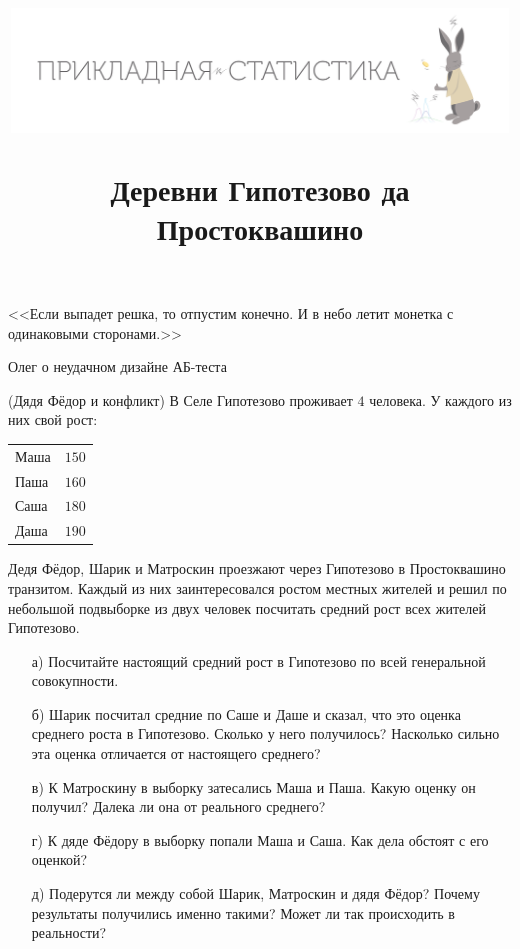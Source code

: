 \documentclass[12pt, a4paper, oneside]{article}
\title{\begin{center} \includegraphics[width=0.99\textwidth]{logo.png} \end{center}Деревни Гипотезово да Простоквашино}
\date{ } %
\begin{document}

\maketitle

\epigraph{<<Если выпадет решка, то отпустим конечно.  И в небо летит монетка с одинаковыми сторонами.>>}{Олег о неудачном дизайне АБ-теста}

\begin{problem}{(Дядя Фёдор и конфликт)}
В Селе  Гипотезово проживает $4$ человека. У каждого из них свой рост:

\begin{center}
	\begin{tabular}{lc}
		\toprule
		Маша &  $150$\\
		Паша &  $160$\\
		Саша &  $180$\\
		Даша &  $190$\\ 
		\bottomrule
	\end{tabular}	
\end{center}

Дедя Фёдор, Шарик и Матроскин проезжают через Гипотезово в Простоквашино транзитом. Каждый из них заинтересовался ростом местных жителей и решил по небольшой подвыборке из двух человек посчитать средний рост всех жителей Гипотезово. 

\begin{enumerate} 
	\item[а)] Посчитайте настоящий средний рост в Гипотезово по всей генеральной совокупности.
	\item[б)] Шарик посчитал средние по Саше и Даше и сказал, что это оценка среднего роста в Гипотезово. Сколько у него получилось? Насколько сильно эта оценка отличается от настоящего среднего? 
	\item[в)] К Матроскину в выборку затесались Маша и Паша. Какую оценку он получил? Далека ли она от реального среднего? 
	\item[г)] К дяде Фёдору в выборку попали Маша и Саша. Как дела обстоят с его оценкой? 
	\item[д)] Подерутся ли между собой Шарик, Матроскин и дядя Фёдор? Почему результаты получились именно такими? Может ли так происходить в реальности? 
\end{enumerate} 
\end{problem}
\end{document}
